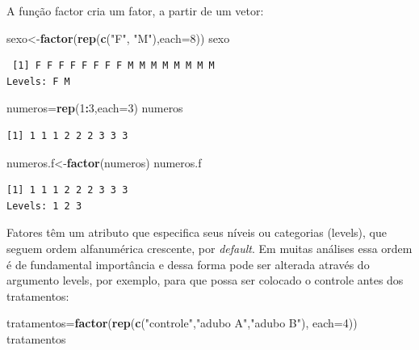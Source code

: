 \documentclass[12pt,brazil,]{book}
\newenvironment{Shaded}{\begin{snugshade}}{\end{snugshade}}
\newcommand{\DataTypeTok}[1]{\textcolor[rgb]{0.13,0.29,0.53}{#1}}
\newcommand{\DecValTok}[1]{\textcolor[rgb]{0.00,0.00,0.81}{#1}}
\newcommand{\KeywordTok}[1]{\textcolor[rgb]{0.13,0.29,0.53}{\textbf{#1}}}
\newcommand{\NormalTok}[1]{#1}
\newcommand{\OperatorTok}[1]{\textcolor[rgb]{0.81,0.36,0.00}{\textbf{#1}}}
\newcommand{\StringTok}[1]{\textcolor[rgb]{0.31,0.60,0.02}{#1}}
\begin{document}
A função factor cria um fator, a partir de um vetor:

\begin{Shaded}
\begin{Highlighting}[]
\NormalTok{sexo<-}\KeywordTok{factor}\NormalTok{(}\KeywordTok{rep}\NormalTok{(}\KeywordTok{c}\NormalTok{(}\StringTok{"F"}\NormalTok{, }\StringTok{"M"}\NormalTok{),}\DataTypeTok{each=}\DecValTok{8}\NormalTok{))}
\NormalTok{sexo}
\end{Highlighting}
\end{Shaded}

\begin{verbatim}
 [1] F F F F F F F F M M M M M M M M
Levels: F M
\end{verbatim}

\begin{Shaded}
\begin{Highlighting}[]
\NormalTok{numeros=}\KeywordTok{rep}\NormalTok{(}\DecValTok{1}\OperatorTok{:}\DecValTok{3}\NormalTok{,}\DataTypeTok{each=}\DecValTok{3}\NormalTok{)}
\NormalTok{numeros}
\end{Highlighting}
\end{Shaded}

\begin{verbatim}
[1] 1 1 1 2 2 2 3 3 3
\end{verbatim}

\begin{Shaded}
\begin{Highlighting}[]
\NormalTok{numeros.f<-}\KeywordTok{factor}\NormalTok{(numeros)}
\NormalTok{numeros.f}
\end{Highlighting}
\end{Shaded}

\begin{verbatim}
[1] 1 1 1 2 2 2 3 3 3
Levels: 1 2 3
\end{verbatim}

Fatores têm um atributo que especifica seus níveis ou categorias
(levels), que seguem ordem alfanumérica crescente, por \emph{default}.
Em muitas análises essa ordem é de fundamental importância e dessa forma
pode ser alterada através do argumento levels, por exemplo, para que
possa ser colocado o controle antes dos tratamentos:

\begin{Shaded}
\begin{Highlighting}[]
\NormalTok{tratamentos=}\KeywordTok{factor}\NormalTok{(}\KeywordTok{rep}\NormalTok{(}\KeywordTok{c}\NormalTok{(}\StringTok{"controle"}\NormalTok{,}\StringTok{"adubo A"}\NormalTok{,}\StringTok{"adubo B"}\NormalTok{), }\DataTypeTok{each=}\DecValTok{4}\NormalTok{))}
\NormalTok{tratamentos}
\end{Highlighting}
\end{Shaded}
\end{document}
